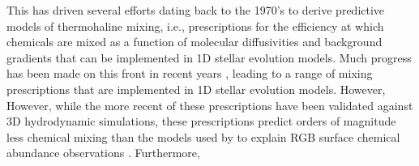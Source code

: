 This has driven several efforts dating back to the 1970's to derive predictive models of thermohaline mixing, i.e., prescriptions for the efficiency at which chemicals are mixed as a function of molecular diffusivities and background gradients that can be implemented in 1D stellar evolution models. 
Much progress has been made on this front in recent years \citep[see review by][and Sec.~\ref{sec:parameterizations} of this paper]{garaud_DDC_review_2018}, leading to a range of mixing prescriptions that are implemented in 1D stellar evolution models. 
However, 
However, while the more recent of these prescriptions \citep[e.g.~][]{traxler_etal_2011,brown_etal_2013} have been validated against 3D hydrodynamic simulations, these prescriptions predict orders of magnitude less chemical mixing than the models used by \citet{charbonnel_thermohaline_2007} to explain RGB surface chemical abundance observations \citep[see Sec.~3.1 of][]{traxler_etal_2011}. 
Furthermore, 

